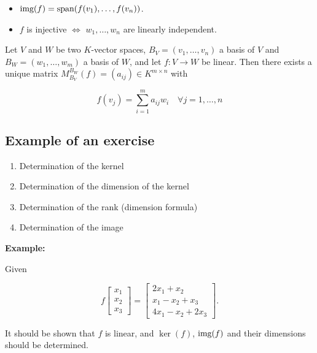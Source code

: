 \begin{itemize}
    
    \item \(\text{img}(f) = \text{span}(f(v_1), \dots, f(v_n))\).

    \item \(f\) is injective \(\Leftrightarrow\) \(w_1, \dots, w_n\) are linearly independent.

\end{itemize}

Let \(V\) and \(W\) be two \(K\)-vector spaces, \(B_V = (v_1, \dots, v_n)\) a basis of \(V\) and \(B_W = (w_1, \dots, w_m)\) a basis of \(W\), and let \(f : V \rightarrow W\) be linear. Then there exists a unique matrix \(M_{B_V}^{B_W}(f) = (a_{ij}) \in K^{m \times n}\) with

\[
    f(v_j) = \sum_{i=1}^{m} a_{ij}w_i \quad \forall j = 1, \dots, n
\]

\subsection{Example of an exercise}

\begin{enumerate}
    
    \item Determination of the kernel
    
    \item Determination of the dimension of the kernel
    
    \item Determination of the rank (dimension formula)
    
    \item Determination of the image

\end{enumerate}

\textbf{Example:}

Given

\[
    f\begin{bmatrix}
    x_1 \\
    x_2 \\
    x_3
    \end{bmatrix} =
    \begin{bmatrix}
    2x_1 + x_2 \\
    x_1 - x_2 + x_3 \\
    4x_1 - x_2 + 2x_3
    \end{bmatrix} .
\]

It should be shown that \(f\) is linear, and \(\ker(f)\), \(\text{img}(f)\) and their dimensions should be determined.

